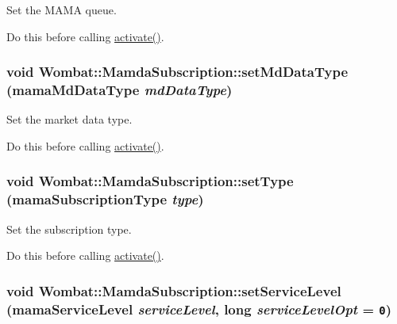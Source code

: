 Set the MAMA queue. 

Do this before calling \hyperlink{classWombat_1_1MamdaSubscription_50f691571f680c77ad949f5c162afe35}{activate()}. \hypertarget{classWombat_1_1MamdaSubscription_71750674e172cbb0ad997779bd124818}{
\subsubsection[setMdDataType]{\setlength{\rightskip}{0pt plus 5cm}void Wombat::Mamda\-Subscription::set\-Md\-Data\-Type (mama\-Md\-Data\-Type {\em md\-Data\-Type})}}
\label{classWombat_1_1MamdaSubscription_71750674e172cbb0ad997779bd124818}


Set the market data type. 

Do this before calling \hyperlink{classWombat_1_1MamdaSubscription_50f691571f680c77ad949f5c162afe35}{activate()}. \hypertarget{classWombat_1_1MamdaSubscription_d80680256c2a988523208bfbfe9c9ade}{
\subsubsection[setType]{\setlength{\rightskip}{0pt plus 5cm}void Wombat::Mamda\-Subscription::set\-Type (mama\-Subscription\-Type {\em type})}}
\label{classWombat_1_1MamdaSubscription_d80680256c2a988523208bfbfe9c9ade}


Set the subscription type. 

Do this before calling \hyperlink{classWombat_1_1MamdaSubscription_50f691571f680c77ad949f5c162afe35}{activate()}. \hypertarget{classWombat_1_1MamdaSubscription_673340d378cd6b402a22959a7343f897}{
\subsubsection[setServiceLevel]{\setlength{\rightskip}{0pt plus 5cm}void Wombat::Mamda\-Subscription::set\-Service\-Level (mama\-Service\-Level {\em service\-Level}, long {\em service\-Level\-Opt} = {\tt 0})}}
\label{classWombat_1_1MamdaSubscription_673340d378cd6b402a22959a7343f897}


